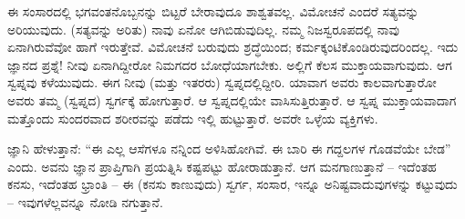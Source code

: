 \vskip 1.5pt

ಈ ಸಂಸಾರದಲ್ಲಿ ಭಗವಂತನೊಬ್ಬನನ್ನು ಬಿಟ್ಟರೆ ಬೇರಾವುದೂ ಶಾಶ್ವತವಲ್ಲ. ವಿಮೋಚನೆ ಎಂದರೆ ಸತ್ಯವನ್ನು ಅರಿಯುವುದು. (ಸತ್ಯವನ್ನು ಅರಿತು) ನಾವು ಏನೋ ಆಗಿಬಿಡುವುದಿಲ್ಲ. ನಮ್ಮ ನಿಜಸ್ವರೂಪದಲ್ಲಿ ನಾವು ಏನಾಗಿರುವೆವೋ ಹಾಗೆ ಇರುತ್ತೇವೆ. ವಿಮೋಚನೆ ಬರುವುದು ಶ್ರದ್ಧೆಯಿಂದ; ಕರ್ಮಕ್ಕಂಟಿಕೊಂಡಿರುವುದರಿಂದಲ್ಲ. ಇದು ಜ್ಞಾನದ ಪ್ರಶ್ನೆ! ನೀವು ಏನಾಗಿದ್ದೀರೋ ನಿಮಗದರ ಬೋಧೆಯಾಗಬೇಕು. ಅಲ್ಲಿಗೆ ಕೆಲಸ ಮುಕ್ತಾಯವಾಗುವುದು. ಆಗ ಸ್ವಪ್ನವು ಕಳೆಯುವುದು. ಈಗ ನೀವು (ಮತ್ತು ಇತರರು) ಸ್ವಪ್ನದಲ್ಲಿದ್ದೀರಿ. ಯಾವಾಗ ಅವರು ಕಾಲವಾಗುತ್ತಾರೋ ಅವರು ತಮ್ಮ (ಸ್ವಪ್ನದ) ಸ್ವರ್ಗಕ್ಕೆ ಹೋಗುತ್ತಾರೆ. ಆ ಸ್ವಪ್ನದಲ್ಲಿಯೇ ವಾಸಿಸುತ್ತಿರುತ್ತಾರೆ. ಆ ಸ್ವಪ್ನ ಮುಕ್ತಾಯವಾದಾಗ ಮತ್ತೊಂದು ಸುಂದರವಾದ ಶರೀರವನ್ನು ಪಡೆದು ಇಲ್ಲಿ ಹುಟ್ಟುತ್ತಾರೆ. ಅವರೇ ಒಳ್ಳೆಯ ವ್ಯಕ್ತಿಗಳು.

\newpage

ಜ್ಞಾನಿ ಹೇಳುತ್ತಾನೆ: “ಈ ಎಲ್ಲ ಆಸೆಗಳೂ ನನ್ನಿಂದ ಅಳಿಸಿಹೋಗಿವೆ. ಈ ಬಾರಿ ಈ ಗದ್ದಲಗಳ ಗೊಡವೆಯೇ ಬೇಡ'' ಎಂದು. ಅವನು ಜ್ಞಾನ ಪ್ರಾಪ್ತಿಗಾಗಿ ಪ್ರಯತ್ನಿಸಿ ಕಷ್ಟಪಟ್ಟು ಹೋರಾಡುತ್ತಾನೆ. ಆಗ ಮನಗಾಣುತ್ತಾನೆ – ಇದೆಂತಹ ಕನಸು, ಇದೆಂತಹ ಭ್ರಾಂತಿ – ಈ (ಕನಸು ಕಾಣುವುದು) ಸ್ವರ್ಗ, ಸಂಸಾರ, ಇನ್ನೂ ಅನಿಷ್ಟವಾದುವುಗಳನ್ನು ಕಟ್ಟುವುದು – ಇವುಗಳೆಲ್ಲವನ್ನೂ ನೋಡಿ ನಗುತ್ತಾನೆ.

